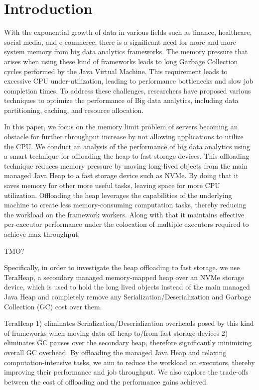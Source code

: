 \section{Introduction}
\label{sec:intro}

With the exponential growth of data in various fields such as finance,
healthcare, social media, and e-commerce, there is a significant need
for more and more system memory from big data analytics frameworks. 
The memory pressure that arises when using these kind of frameworks leads to
long Garbage Collection cycles performed by the Java Virtual Machine.
This requirement leads to excessive CPU under-utilization, 
leading to performance bottlenecks and slow job completion
times. To address these challenges, researchers have proposed various
techniques to optimize the performance of Big data analytics, including
data partitioning, caching, and resource allocation.

In this paper, we focus on the memory limit problem of servers
becoming an obstacle for further throughput increase by not
allowing applications to utilize the CPU. We conduct an
analysis of the performance of big data analytics using a smart
technique for offloading the heap to fast storage devices.
This offloading technique reduces memory pressure by
moving long-lived objects from the main managed Java
Heap to a fast storage device such as NVMe. By doing that it saves memory for
other more useful tasks, leaving space for more CPU utilization.
Offloading the heap leverages the capabilities of the underlying machine to
create less memory-consuming computation tasks, thereby reducing the
workload on the framework workers. Along with that it maintains effective
per-executor performance under the colocation of multiple executors
required to achieve max throughput.

TMO?

Specifically, in order to investigate the heap offloading to fast storage,
we use TeraHeap, a secondary managed
memory-mapped heap over an NVMe storage device, which is used to hold
the long lived objects instead of the main
managed Java Heap and completely remove any
Serialization/Deserialization and Garbage Collection (GC) cost over
them.

TeraHeap 1) eliminates Serialization/Deserialization overheads posed
by this kind of frameworks when moving data off-heap to/from fast
storage devices 2) eliminates GC pauses over the secondary heap,
therefore significantly minimizing overall GC overhead. By offloading
the managed Java Heap and relaxing computation-intensive tasks, we aim
to reduce the workload on executors, thereby improving their
performance and job throughput. We also explore the trade-offs between
the cost of offloading and the performance gains achieved.

